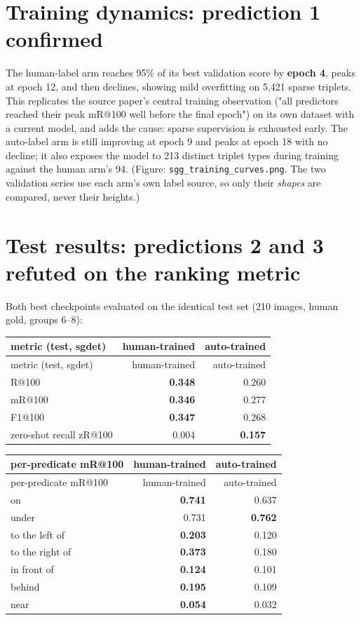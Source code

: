 \section{Training dynamics: prediction 1 confirmed}

The human-label arm reaches 95\% of its best validation score by \textbf{epoch 4}, peaks at epoch 12, and then declines, showing mild overfitting on 5,421 sparse triplets. This replicates the source paper's central training observation ("all predictors reached their peak mR@100 well before the final epoch") on its own dataset with a current model, and adds the cause: sparse supervision is exhausted early. The auto-label arm is still improving at epoch 9 and peaks at epoch 18 with no decline; it also exposes the model to 213 distinct triplet types during training against the human arm's 94. (Figure: \texttt{sgg\_training\_curves.png}. The two validation series use each arm's own label source, so only their \textit{shapes} are compared, never their heights.)

\section{Test results: predictions 2 and 3 refuted on the ranking metric}

Both best checkpoints evaluated on the identical test set (210 images, human gold, groups 6--8):

\begin{center}
\small
\begin{longtable}{lrr}
\hline
metric (test, sgdet) & human-trained & auto-trained \\
\hline
\endfirsthead
\hline
metric (test, sgdet) & human-trained & auto-trained \\
\hline
\endhead
R@100 & \textbf{0.348} & 0.260 \\
mR@100 & \textbf{0.346} & 0.277 \\
F1@100 & \textbf{0.347} & 0.268 \\
zero-shot recall zR@100 & 0.004 & \textbf{0.157} \\
\hline
\end{longtable}
\end{center}

\begin{center}
\small
\begin{longtable}{lrr}
\hline
per-predicate mR@100 & human-trained & auto-trained \\
\hline
\endfirsthead
\hline
per-predicate mR@100 & human-trained & auto-trained \\
\hline
\endhead
on & \textbf{0.741} & 0.637 \\
under & 0.731 & \textbf{0.762} \\
to the left of & \textbf{0.203} & 0.120 \\
to the right of & \textbf{0.373} & 0.180 \\
in front of & \textbf{0.124} & 0.101 \\
behind & \textbf{0.195} & 0.109 \\
near & \textbf{0.054} & 0.032 \\
\hline
\end{longtable}
\end{center}

